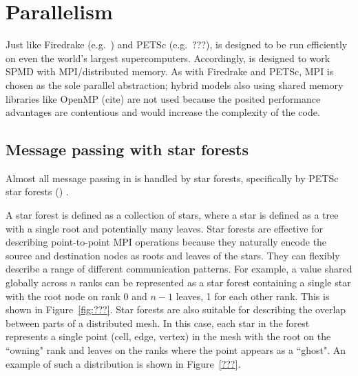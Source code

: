 \chapter{Parallelism}

Just like Firedrake (e.g.~\cite{betteridgeCodeGenerationProductive2021}) and PETSc (e.g.~???),  is designed to be run efficiently on even the world's largest supercomputers.
Accordingly,  is designed to work SPMD with MPI/distributed memory.
As with Firedrake and PETSc, MPI is chosen as the sole parallel abstraction; hybrid models also using shared memory libraries like OpenMP (cite) are not used because the posited performance advantages are contentious  and would increase the complexity of the code.

\section{Message passing with star forests}

Almost all message passing in  is handled by star forests, specifically by PETSc star forests () .

A star forest is defined as a collection of stars, where a star is defined as a tree with a single root and potentially many leaves.
Star forests are effective for describing point-to-point MPI operations because they naturally encode the source and destination nodes as roots and leaves of the stars.
They can flexibly describe a range of different communication patterns.
For example, a value shared globally across $n$ ranks can be represented as a star forest containing a single star with the root node on rank 0 and $n-1$ leaves, 1 for each other rank.
This is shown in Figure~\ref{fig:???}.
Star forests are also suitable for describing the overlap between parts of a distributed mesh.
In this case, each star in the forest represents a single point (cell, edge, vertex) in the mesh with the root on the ``owning" rank and leaves on the ranks where the point appears as a ``ghost".
An example of such a distribution is shown in Figure~\ref{???}.

\begin{figure}


% 


\end{figure}

